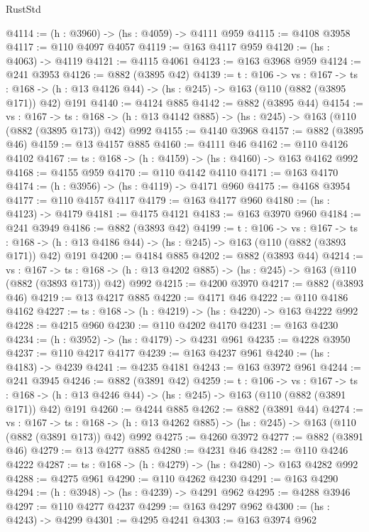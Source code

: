 \begin{lexlean}{RustStd}
\begin{coremodule}
@4114 := (h : @3960) -> (hs : @4059) -> @4111 @959
@4115 := @4108 @3958
@4117 := @110 @4097 @4057
@4119 := @163 @4117 @959
@4120 := (hs : @4063) -> @4119
@4121 := @4115 @4061
@4123 := @163 @3968 @959
@4124 := @241 @3953
@4126 := @882 (@3895 @42)
@4139 := {t : @106} ->
  {vs : @167} ->
  {ts : @168} -> (h : @13 @4126 @44) -> (hs : @245) -> @163 (@110 (@882 (@3895 @171)) @42) @191
@4140 := @4124 @885
@4142 := @882 (@3895 @44)
@4154 := {vs : @167} ->
  {ts : @168} -> (h : @13 @4142 @885) -> (hs : @245) -> @163 (@110 (@882 (@3895 @173)) @42) @992
@4155 := @4140 @3968
@4157 := @882 (@3895 @46)
@4159 := @13 @4157 @885
@4160 := @4111 @46
@4162 := @110 @4126 @4102
@4167 := {ts : @168} -> (h : @4159) -> (hs : @4160) -> @163 @4162 @992
@4168 := @4155 @959
@4170 := @110 @4142 @4110
@4171 := @163 @4170
@4174 := (h : @3956) -> (hs : @4119) -> @4171 @960
@4175 := @4168 @3954
@4177 := @110 @4157 @4117
@4179 := @163 @4177 @960
@4180 := (hs : @4123) -> @4179
@4181 := @4175 @4121
@4183 := @163 @3970 @960
@4184 := @241 @3949
@4186 := @882 (@3893 @42)
@4199 := {t : @106} ->
  {vs : @167} ->
  {ts : @168} -> (h : @13 @4186 @44) -> (hs : @245) -> @163 (@110 (@882 (@3893 @171)) @42) @191
@4200 := @4184 @885
@4202 := @882 (@3893 @44)
@4214 := {vs : @167} ->
  {ts : @168} -> (h : @13 @4202 @885) -> (hs : @245) -> @163 (@110 (@882 (@3893 @173)) @42) @992
@4215 := @4200 @3970
@4217 := @882 (@3893 @46)
@4219 := @13 @4217 @885
@4220 := @4171 @46
@4222 := @110 @4186 @4162
@4227 := {ts : @168} -> (h : @4219) -> (hs : @4220) -> @163 @4222 @992
@4228 := @4215 @960
@4230 := @110 @4202 @4170
@4231 := @163 @4230
@4234 := (h : @3952) -> (hs : @4179) -> @4231 @961
@4235 := @4228 @3950
@4237 := @110 @4217 @4177
@4239 := @163 @4237 @961
@4240 := (hs : @4183) -> @4239
@4241 := @4235 @4181
@4243 := @163 @3972 @961
@4244 := @241 @3945
@4246 := @882 (@3891 @42)
@4259 := {t : @106} ->
  {vs : @167} ->
  {ts : @168} -> (h : @13 @4246 @44) -> (hs : @245) -> @163 (@110 (@882 (@3891 @171)) @42) @191
@4260 := @4244 @885
@4262 := @882 (@3891 @44)
@4274 := {vs : @167} ->
  {ts : @168} -> (h : @13 @4262 @885) -> (hs : @245) -> @163 (@110 (@882 (@3891 @173)) @42) @992
@4275 := @4260 @3972
@4277 := @882 (@3891 @46)
@4279 := @13 @4277 @885
@4280 := @4231 @46
@4282 := @110 @4246 @4222
@4287 := {ts : @168} -> (h : @4279) -> (hs : @4280) -> @163 @4282 @992
@4288 := @4275 @961
@4290 := @110 @4262 @4230
@4291 := @163 @4290
@4294 := (h : @3948) -> (hs : @4239) -> @4291 @962
@4295 := @4288 @3946
@4297 := @110 @4277 @4237
@4299 := @163 @4297 @962
@4300 := (hs : @4243) -> @4299
@4301 := @4295 @4241
@4303 := @163 @3974 @962

\end{coremodule}
\end{lexlean}
